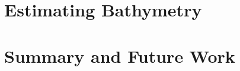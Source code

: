 \documentclass[12pt]{article}
\begin{document}
\section{Estimating Bathymetry}




%

\section{Summary and Future Work}


%


\end{document}
